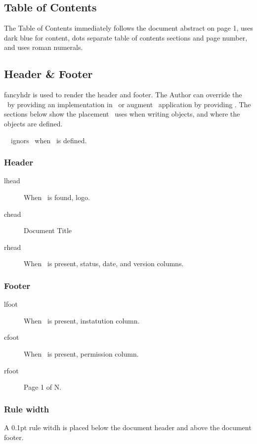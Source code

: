\documentclass[12pt]{tlc-article}
\begin{document}
\subsection{Table of Contents}
The Table of Contents immediately follows the document abstract on page 1, uses
dark blue for content, dots separate table of contents sections and page number,
and uses roman numerals.

\subsection{Header \& Footer}
fancyhdr is used to render the header and footer.  The Author can override the
\tlcA\ by providing an implementation in \tlcHF\, or augment \tlcA\ 
application by providing \tlcVE. The sections below show the placement \tlcA\
uses when writing objects, and where the objects are defined.

\tlcNote\ \tlcA\ ignors \tlcVE\ when \tlcHF\ is defined.

\subsubsection*{Header}

\begin{description}
  \item[lhead] When \tlcLG\ is found, logo.
  \item[chead] Document Title
  \item[rhead] When \tlcVE\ is present, status, date, and version columns.
\end{description}

\subsubsection*{Footer}

\begin{description}
  \item[lfoot] When \tlcVE\ is present, instatution column. 
  \item[cfoot] When \tlcVE\ is present, permission column. 
  \item[rfoot] Page 1 of N.
\end{description}

\subsubsection*{Rule width}
A 0.1pt rule witdh is placed below the document header and above the document
footer.
\end{document}
